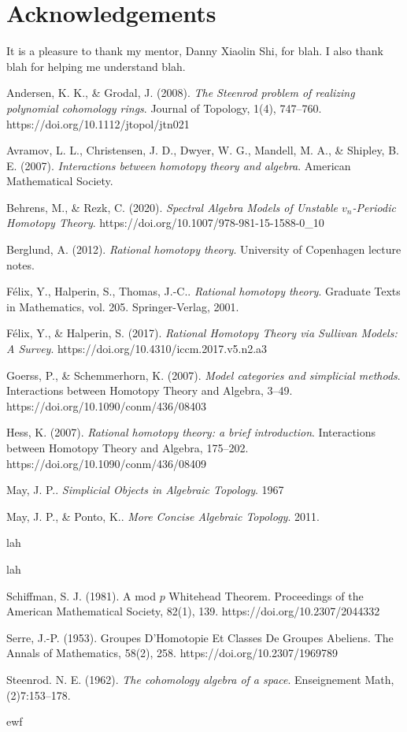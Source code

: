 \documentclass[psamsfonts]{amsart}
\theoremstyle{definition}
\theoremstyle{remark}
\numberwithin{equation}{section}
\begin{document}
\section*{Acknowledgements}

It is a pleasure to thank my mentor, Danny Xiaolin Shi, for blah. I also thank blah for helping 
me understand blah.

\newpage
\begin{thebibliography}{2}

Andersen, K. K., \& Grodal, J. (2008). \textit{The Steenrod problem of realizing polynomial cohomology rings}. Journal of Topology, 1(4), 747–760. https://doi.org/10.1112/jtopol/jtn021 

Avramov, L. L., Christensen, J. D., Dwyer, W. G., Mandell, M. A., \& Shipley, B. E. (2007). \textit{Interactions between homotopy theory and algebra}. American Mathematical Society.

Behrens, M., \& Rezk, C. (2020). \textit{Spectral Algebra Models of Unstable $v_n$-Periodic Homotopy Theory}. https://doi.org/10.1007/978-981-15-1588-0\_10 

Berglund, A. (2012). \textit{Rational homotopy theory}. University of Copenhagen lecture notes.

Félix, Y., Halperin, S., Thomas, J.-C.. \textit{Rational homotopy theory}. Graduate Texts in Mathematics, vol. 205. Springer-Verlag, 2001.

Félix, Y., \& Halperin, S. (2017). \textit{Rational Homotopy Theory via Sullivan Models: A Survey}. https://doi.org/10.4310/iccm.2017.v5.n2.a3

Goerss, P., \& Schemmerhorn, K. (2007). \textit{Model categories and simplicial methods}. Interactions between Homotopy Theory and Algebra, 3–49. https://doi.org/10.1090/conm/436/08403 

Hess, K. (2007). \textit{Rational homotopy theory: a brief introduction}. Interactions between Homotopy Theory and Algebra, 175–202. https://doi.org/10.1090/conm/436/08409

 May, J. P.. \textit{Simplicial Objects in Algebraic Topology}. 1967

May, J. P., \& Ponto, K.. \textit{More Concise Algebraic Topology}. 2011.

 lah

 lah

Schiffman, S. J. (1981). A mod $p$ Whitehead Theorem. Proceedings of the American Mathematical Society, 82(1), 139. https://doi.org/10.2307/2044332 

Serre, J.-P. (1953). Groupes D'Homotopie Et Classes De Groupes Abeliens. The Annals of Mathematics, 58(2), 258. https://doi.org/10.2307/1969789 

Steenrod. N. E. (1962). \textit{The cohomology algebra of a space}. Enseignement Math, (2)7:153–178.

 ewf

\end{thebibliography}
\end{document}
